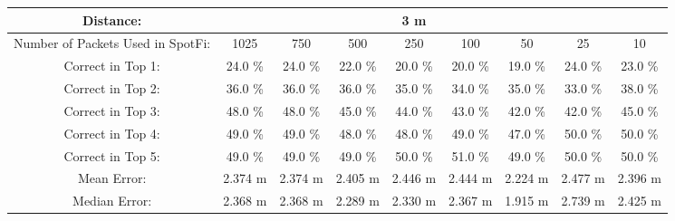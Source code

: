 \begin{tabular}{| c || c | c | c | c | c | c | c | c |}
\hline
Distance: &  &  &  & 3 m  &  &  &  &  \\
\hline
Number of Packets Used in SpotFi: & 1025 & 750 & 500 & 250 & 100 & 50 & 25 & 10 \\
\hline
\hline
Correct in Top 1: & 24.0 \% & 24.0 \% & 22.0 \% & 20.0 \% & 20.0 \% & 19.0 \% & 24.0 \% & 23.0 \% \\
\hline
Correct in Top 2: & 36.0 \% & 36.0 \% & 36.0 \% & 35.0 \% & 34.0 \% & 35.0 \% & 33.0 \% & 38.0 \% \\
\hline
Correct in Top 3: & 48.0 \% & 48.0 \% & 45.0 \% & 44.0 \% & 43.0 \% & 42.0 \% & 42.0 \% & 45.0 \% \\
\hline
Correct in Top 4: & 49.0 \% & 49.0 \% & 48.0 \% & 48.0 \% & 49.0 \% & 47.0 \% & 50.0 \% & 50.0 \% \\
\hline
Correct in Top 5: & 49.0 \% & 49.0 \% & 49.0 \% & 50.0 \% & 51.0 \% & 49.0 \% & 50.0 \% & 50.0 \% \\
\hline
\hline
Mean Error: & 2.374 m & 2.374 m & 2.405 m & 2.446 m & 2.444 m & 2.224 m & 2.477 m & 2.396 m \\
\hline
Median Error: & 2.368 m & 2.368 m & 2.289 m & 2.330 m & 2.367 m & 1.915 m & 2.739 m & 2.425 m \\
\hline
\end{tabular}